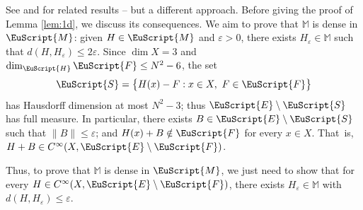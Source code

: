 \documentclass[JEP,XML,SOM,Unicode,NoFloatCountersInSection]{cedram}
\let\pazocal\EuScript
\let\sep:
\theoremstyle{definition}
\newcommand{\FF}{\pazocal{F}}
\newcommand{\EE}{\pazocal{E}}
\newcommand{\MM}{\pazocal{M}}
\newcommand{\HH}{\pazocal{H}}
\newcommand{\SSS}{{\pazocal{S}}}
\newcommand{\Mm}{\mathbb{M}}
\let\epsi\varepsilon
\begin{document}
See \cite[\S2]{AS78} and \cite[\S3]{DE99} for related results -- but a different approach.
Before giving the proof of Lemma \ref{lem:1d}, we discuss its consequences. We aim to prove that $\Mm$ is dense in $\MM$: given $H \in \MM$ and $\epsi > 0$, there exists $H_\epsi \in \Mm$ such that $d(H,H_\epsi) \leq 2\epsi$. Since $\dim X = 3$ and $\dim_\HH \FF \leq N^2-6$, the set
\begin{equation*}
\SSS = \bigl\{ H(x) - F \sep x \in X, \ F \in \FF\bigr\}
\end{equation*}
has Hausdorff dimension at most $N^2-3$; thus $\EE \setminus \SSS$ has full measure. In particular, there exists $B \in \EE \setminus \SSS$ such that $\| B \| \leq \epsi$; and $H(x) + B \notin \FF$ for every $x \in X$. That~is, $H+B \in C^\infty(X,\EE\setminus \FF)$.

Thus, to prove that $\Mm$ is dense in $\MM$, we just need to show that for every $H \in C^\infty(X,\EE\setminus\FF)$, there exists $H_\epsi \in \Mm$ with $d(H,H_\epsi) \leq \epsi$.
\end{document}
